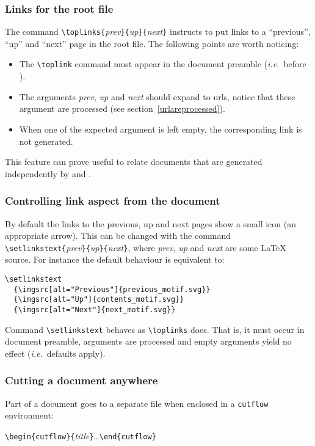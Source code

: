 \subsubsection{Links for the root file}
The command \verb+\toplinks{+\textit{prev}\verb+}{+\textit{up}\verb+}{+\textit{next}\verb+}+ instructs \hacha{}  to put links to a
``previous'', ``up'' and ``next'' page in the root file.
The following points are worth noticing:
\begin{itemize}
\item The \verb+\toplink+ command must appear in the document preamble
(\emph{i.e.}\ before \verb++).
\item The arguments
\textit{prev}, \textit{up} and \textit{next} should expand to urls,
notice that these argument are processed (see section~\ref{urlareprocessed}).
\item When one of the expected argument is left empty,
the corresponding link is not generated.
\end{itemize}
This feature can prove useful to
relate documents that are generated independently by
\hevea{} and \hacha{}.

\subsubsection{Controlling link aspect from the document}
%
By default the links to the previous, up and next pages show a small
icon (an appropriate arrow). This can be changed with the command
\verb+\setlinkstext{+\textit{prev}\verb+}{+\textit{up}\verb+}{+\textit{next}\verb+}+,
where \textit{prev}, \textit{up} and \textit{next} are some \LaTeX{}
source.
For instance the default behaviour is equivalent to:
\begin{verbatim}
\setlinkstext
  {\imgsrc[alt="Previous"]{previous_motif.svg}}
  {\imgsrc[alt="Up"]{contents_motif.svg}}
  {\imgsrc[alt="Next"]{next_motif.svg}}
\end{verbatim}
Command \verb+\setlinkstext+ behaves as \verb+\toplinks+ does.
That is, it must occur in document preamble, arguments are processed
and empty arguments yield no effect (\emph{i.e.}\ defaults apply).

\subsubsection{Cutting a document anywhere}
Part of a document goes to a separate file when enclosed in a
\verb+cutflow+ environment:
\begin{flushleft}
  \verb+\begin{cutflow}{+\textit{title}\verb+}+\ldots\verb+\end{cutflow}+
\end{flushleft}

